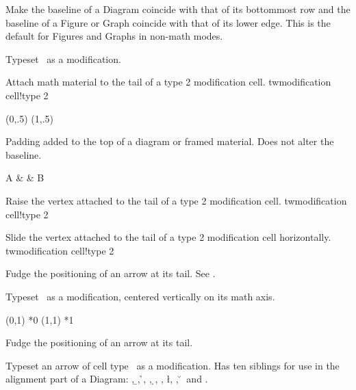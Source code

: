 Make the baseline of a Diagram coincide with that of
its bottommost row and
the baseline of a Figure or Graph coincide with that of
its lower edge.
This is the default for Figures and Graphs in non-math modes.
\endentry

Typeset \text\ as a modification.
\endentry

\mod{}
Attach math material to the tail of a type 2 modification cell.
\sindex tw{modification cell!type 2}

\side
\Graph{5cm}{5mm}
\To (0,.5) (1,.5) 
\endGraph
\endside
\endentry

Padding added to the top of a diagram or framed material.
Does not alter the baseline.

\side
\framed \tpad=10pt
\Diagram
A & \rTo & B \\
\endDiagram
\endside
\endentry

\mod{}
Raise the vertex attached to the tail of a type 2 modification cell.
\sindex tw{modification cell!type 2}
\endentry

\mod{}
Slide the vertex attached to the tail of a type 2 modification cell
horizontally.
\sindex tw{modification cell!type 2}
\endentry

\mod{}
Fudge the positioning of an arrow at its tail. See \csq\hx.
\endentry

Typeset \text\ as a modification, centered vertically on its math axis.

\eg
\gridlines
{}
   (0,1) *0   (1,1) *1
\endGraph
\endeg
\endentry

\mod{}
Fudge the positioning of an arrow at its tail.
\endentry

\entry{\ch\\\type}
Typeset an arrow of cell type \type\ as a modification.
Has ten siblings for use in the alignment part of a Diagram:
\csq\a\type, \csq\b\type, \csq\r\type,
\csq\rd\type, \csq\d\type, \csq\ld\type, \csq\l\type,
\csq\lu\type, \csq\u\type\ and \csq\ru\type.

